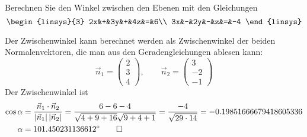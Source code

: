 Berechnen Sie den Winkel zwischen den Ebenen mit den Gleichungen
\[
\begin{linsys}{3}
2x&+&3y&+&4z&=&6\\
3x&-&2y&-&z&=&-4
\end{linsys}
\]

\begin{loesung}
Der Zwischenwinkel kann berechnet werden als Zwischenwinkel der
beiden Normalenvektoren, die man aus den Geradengleichungen
ablesen kann:
$$
\vec n_1=\begin{pmatrix}2\\3\\4\end{pmatrix},\qquad
\vec n_2=\begin{pmatrix}3\\-2\\-1\end{pmatrix}
$$
Der Zwischenwinkel ist
\begin{align*}
\cos\alpha&=\frac{\vec n_1\cdot\vec n_2}{|\vec n_1|\,|\vec n_2|}=\frac{6-6-4}{\sqrt{4+9+16}\sqrt{9+4+1}}
=\frac{-4}{\sqrt{29\cdot14}}=-0.19851666679418605336
\\
\alpha&=101.450231136612^\circ
\qedhere
\end{align*}
\end{loesung}


